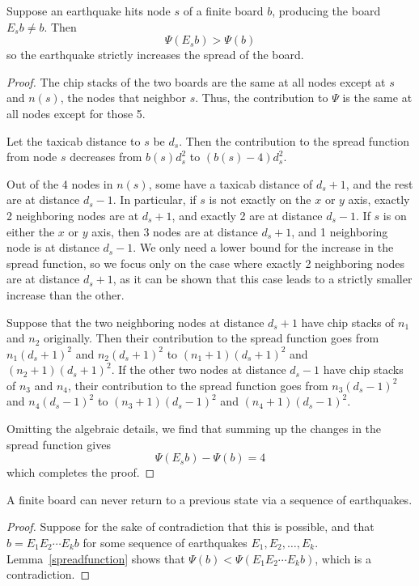 \documentclass[runningheads,a4paper]{llncs}
\begin{document}
\begin{lemma}
\label{spreadfunction}
Suppose an earthquake hits node $s$ of a finite board $b$, producing the board $E_sb \neq b$. Then
\begin{equation*}
\Psi(E_sb) > \Psi(b) 
\end{equation*}
so the earthquake strictly increases the spread of the board.
\end{lemma}
\begin{proof}
The chip stacks of the two boards are the same at all nodes except at $s$ and $n(s)$, the nodes that neighbor $s$. Thus, the contribution to $\Psi$ is the same at all nodes except for those 5.

Let the taxicab distance to $s$ be $d_s$. Then the contribution to the spread function from node $s$ decreases from $b(s)d_s^2$ to $(b(s)-4)d_s^2$.

Out of the 4 nodes in $n(s)$, some have a taxicab distance of $d_s+1$, and the rest are at distance $d_s-1$. In particular, if $s$ is not exactly on the $x$ or $y$ axis, exactly 2 neighboring nodes are at $d_s+1$, and exactly 2 are at distance $d_s-1$. If $s$ is on either the $x$ or $y$ axis, then 3 nodes are at distance $d_s+1$, and 1 neighboring node is at distance $d_s-1$. We only need a lower bound for the increase in the spread function, so we focus only on the case where exactly 2 neighboring nodes are at distance $d_s+1$, as it can be shown that this case leads to a strictly smaller increase than the other.

Suppose that the two neighboring nodes at distance $d_s+1$ have chip stacks of $n_1$ and $n_2$ originally. Then their contribution to the spread function goes from $n_1(d_s+1)^2$ and $n_2(d_s+1)^2$ to $(n_1+1)(d_s+1)^2$ and $(n_2+1)(d_s+1)^2$. If the other two nodes at distance $d_s-1$ have chip stacks of $n_3$ and $n_4$, their contribution to the spread function goes from $n_3(d_s-1)^2$ and $n_4(d_s-1)^2$ to $(n_3+1)(d_s-1)^2$ and $(n_4+1)(d_s-1)^2$.

Omitting the algebraic details, we find that summing up the changes in the spread function gives
\begin{equation*}
 \Psi(E_sb) - \Psi(b) = 4
 \end{equation*}
which completes the proof.
\end{proof}

\begin{corollary}
\label{norepeats}
A finite board can never return to a previous state via a sequence of earthquakes.
\end{corollary}
\begin{proof}
Suppose for the sake of contradiction that this is possible, and that $b = E_1E_2\cdots E_kb$ for some sequence of earthquakes $E_1,E_2,\dots,E_k$. Lemma~\ref{spreadfunction} shows that $\Psi(b) < \Psi(E_1E_2\cdots E_kb)$, which is a contradiction.
\end{proof} 
\end{document}

